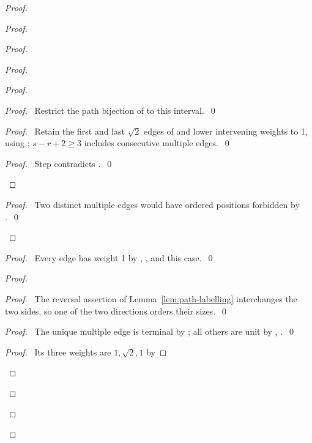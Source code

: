 \begin{proof}
\begin{proof}
\begin{proof}
\begin{proof}
\begin{proof}
\begin{proof}\pf\ Restrict the path bijection of  to this interval.~\qed\end{proof}
\begin{proof}\pf\ Retain the first and last $\sqrt2$ edges of 
and lower intervening weights to 1, using ;
$s-r+2\geq3$ includes consecutive multiple edges.~\qed\end{proof}
\qedstep
\begin{proof}\pf\ Step  contradicts .~\qed\end{proof}
\end{proof}
\qedstep
\begin{proof}\pf\ Two distinct multiple edges would have ordered
positions forbidden by .~\qed\end{proof}
\end{proof}
\begin{proof}\pf\ Every edge has weight 1 by , ,
and this case.~\qed\end{proof}
\begin{proof}
\begin{proof}\pf\ The reversal assertion of Lemma~\ref{lem:path-labelling}
interchanges the two sides, so one of the two directions orders their sizes.~\qed\end{proof}
\begin{proof}\pf\ The unique multiple edge is terminal by
; all others are unit by , .~\qed\end{proof}
\begin{proof}\pf\ Its three weights are $1,\sqrt2,1$ by

\end{proof}
\end{proof}
\end{proof}
\end{proof}
\end{proof}
